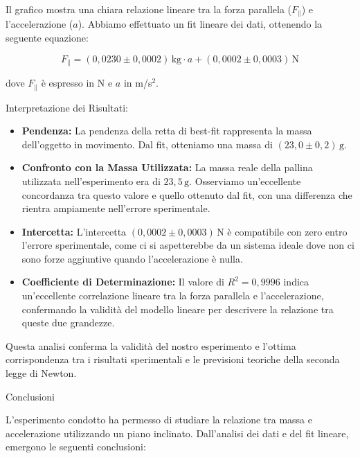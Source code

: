 \documentclass[12pt,a4paper,oneside]{book}
\makeatletter
\renewcommand{\subsection}{\@startsection {subsection}{2}{\z@}
{-3ex \@plus -0.1ex \@minus -.4ex}
{0.5ex \@plus.2ex }
{\color[rgb]{0.141,0.596,0.749}\normalfont\sffamily\bfseries}}
\renewcommand\paragraph{\@startsection{paragraph}{4}{\z@}
{-2ex \@plus-.2ex \@minus .2ex}
{.1ex}
{\normalfont\small\sffamily\bfseries}}
\theoremstyle{esercizio}
\makeatother
\begin{document}
Il grafico mostra una chiara relazione lineare tra la forza parallela ($F_\parallel$) e l'accelerazione ($a$). Abbiamo effettuato un fit lineare dei dati, ottenendo la seguente equazione:

\[ F_\parallel = (0,0230 \pm 0,0002) \, \text{kg} \cdot a + (0,0002 \pm 0,0003) \, \text{N} \]

dove $F_\parallel$ è espresso in N e $a$ in m/s$^2$.

\paragraph{Interpretazione dei Risultati:}

\begin{itemize}
    \item \textbf{Pendenza:} La pendenza della retta di best-fit rappresenta la massa dell'oggetto in movimento. Dal fit, otteniamo una massa di $(23,0 \pm 0,2) \, \text{g}$.
    
    \item \textbf{Confronto con la Massa Utilizzata:} La massa reale della pallina utilizzata nell'esperimento era di $23,5 \, \text{g}$. Osserviamo un'eccellente concordanza tra questo valore e quello ottenuto dal fit, con una differenza che rientra ampiamente nell'errore sperimentale.
    
    \item \textbf{Intercetta:} L'intercetta $(0,0002 \pm 0,0003) \, \text{N}$ è compatibile con zero entro l'errore sperimentale, come ci si aspetterebbe da un sistema ideale dove non ci sono forze aggiuntive quando l'accelerazione è nulla.
    
    \item \textbf{Coefficiente di Determinazione:} Il valore di $R^2 = 0,9996$ indica un'eccellente correlazione lineare tra la forza parallela e l'accelerazione, confermando la validità del modello lineare per descrivere la relazione tra queste due grandezze.
\end{itemize}

Questa analisi conferma la validità del nostro esperimento e l'ottima corrispondenza tra i risultati sperimentali e le previsioni teoriche della seconda legge di Newton.

\subsection{Conclusioni}

L'esperimento condotto ha permesso di studiare la relazione tra massa e accelerazione utilizzando un piano inclinato. Dall'analisi dei dati e del fit lineare, emergono le seguenti conclusioni:
\end{document}
